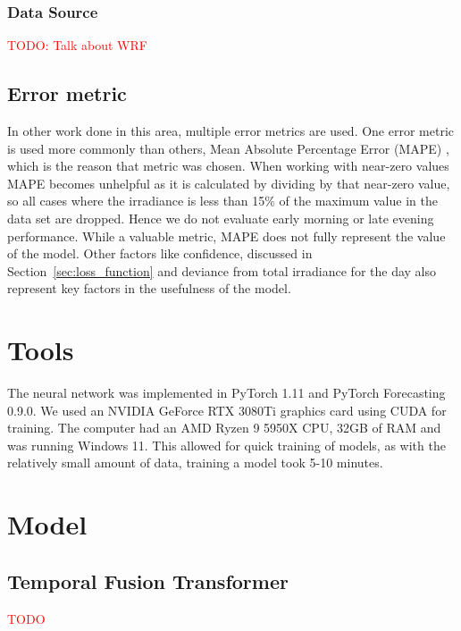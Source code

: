 \subsubsection{Data Source}\label{cha:WRF}
\textcolor{red}{TODO: Talk about WRF} \cite{gueymard_global_2008, rognvaldsson_numerical_2013, jimenez_wrf-solar_2016}


\subsection{Error metric}
In other work done in this area, multiple error metrics are used. One error metric is used more commonly than others, Mean Absolute Percentage Error (MAPE) \cite{lin_temporal_2020, lee_forecasting_2018, jaidee_very_2019, su_machine_2019}, which is the reason that metric was chosen.
When working with near-zero values MAPE becomes unhelpful as it is calculated by dividing by that near-zero value, so all cases where the irradiance is less than 15\% of the maximum value in the data set are dropped. Hence we do not evaluate early morning or late evening performance.
While a valuable metric, MAPE does not  fully represent the value of the model. Other factors like confidence, discussed in Section~\ref{sec:loss_function} and deviance from total irradiance for the day also represent key factors in the usefulness of the model.

\newpage


\section{Tools}
The neural network was implemented in PyTorch 1.11 and PyTorch Forecasting 0.9.0. We used an NVIDIA GeForce RTX 3080Ti graphics card using CUDA for training. The computer had an AMD Ryzen 9 5950X CPU, 32GB of RAM and was running Windows 11.
This allowed for quick training of models, as with the relatively small amount of data, training a model took 5-10 minutes.


\newpage
\section{Model}
    \subsection{Temporal Fusion Transformer}
    \textcolor{red}{TODO}
    \cite{lim_temporal_2020}
    
